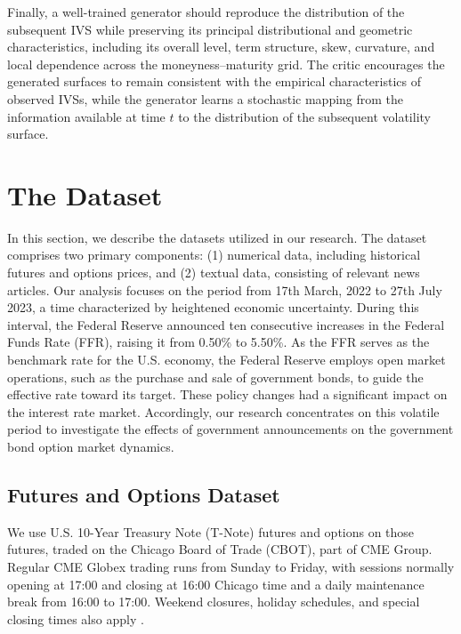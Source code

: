 Finally, a well-trained generator should reproduce the distribution of the subsequent IVS while preserving its principal distributional and geometric characteristics, including its overall level, term structure, skew, curvature, and local dependence across the moneyness--maturity grid. The critic encourages the generated surfaces to remain consistent with the empirical characteristics of observed IVSs, while the generator learns a stochastic mapping from the information available at time $t$ to the distribution of the subsequent volatility surface.




%

\section{The Dataset}\label{ch3:sec:data}

In this section, we describe the datasets utilized in our research. The dataset comprises two primary components: (1) numerical data, including historical futures and options prices, and (2) textual data, consisting of relevant news articles. Our analysis focuses on the period from 17th March, 2022 to 27th July 2023, a time characterized by heightened economic uncertainty. During this interval, the Federal Reserve announced ten consecutive increases in the Federal Funds Rate (FFR), raising it from 0.50\% to 5.50\%. As the FFR serves as the benchmark rate for the U.S. economy, the Federal Reserve employs open market operations, such as the purchase and sale of government bonds, to guide the effective rate toward its target. These policy changes had a significant impact on the interest rate market. Accordingly, our research concentrates on this volatile period to investigate the effects of government announcements on the government bond option market dynamics.




\subsection*{Futures and Options Dataset}\label{sec: ch3: dataset: option}
We use U.S. 10-Year Treasury Note (T-Note) futures and options on those futures, traded on the Chicago Board of Trade (CBOT), part of CME Group. Regular CME Globex trading runs from Sunday to Friday, with sessions normally opening at 17:00 and closing at 16:00 Chicago time and a daily maintenance break from 16:00 to 17:00. Weekend closures, holiday schedules, and special closing times also apply \citep{cme_tnote_contract_specs}.



